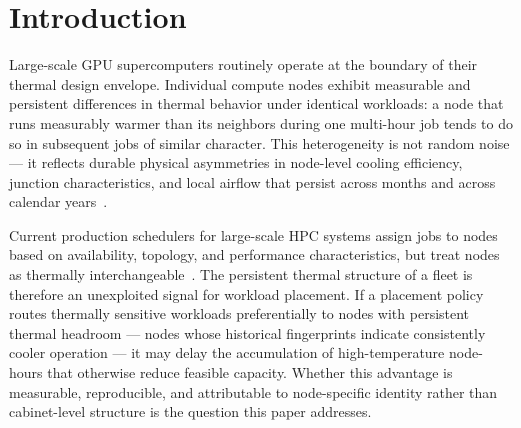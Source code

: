 
\section{Introduction}
\label{sec:intro}

Large-scale GPU supercomputers routinely operate at the boundary of their
thermal design envelope. Individual compute nodes exhibit measurable and
persistent differences in thermal behavior under identical workloads: a node
that runs measurably warmer than its neighbors during one multi-hour job tends
to do so in subsequent jobs of similar character. This heterogeneity is not
random noise — it reflects durable physical asymmetries in node-level cooling
efficiency, junction characteristics, and local airflow that persist across
months and across calendar years~\cite{TODO:thermal-heterogeneity-hpc}.

Current production schedulers for large-scale HPC systems assign jobs to nodes
based on availability, topology, and performance characteristics, but treat
nodes as thermally interchangeable~\cite{TODO:hpc-scheduling-survey}.
The persistent thermal structure of a fleet is therefore an unexploited signal
for workload placement. If a placement policy routes thermally sensitive
workloads preferentially to nodes with persistent thermal headroom — nodes
whose historical fingerprints indicate consistently cooler operation — it may
delay the accumulation of high-temperature node-hours that otherwise reduce
feasible capacity. Whether this advantage is measurable, reproducible, and
attributable to node-specific identity rather than cabinet-level structure is
the question this paper addresses.

